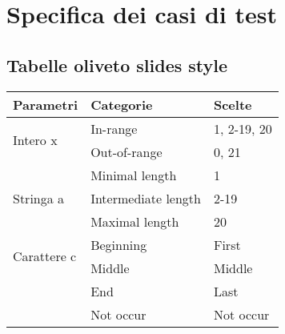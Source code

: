 \chapter{Specifica dei casi di test}

%		
%		
		
\section{Tabelle oliveto slides style}
		\begin{table}[ht]
		\centering
			\begin{tabular}{|p{4cm}|p{4cm}|p{4cm}|}
				\hline
				\textbf{Parametri} & \textbf{Categorie} & \textbf{Scelte} \tabularnewline
				\hline
				\multirow{2}{*}{Intero x}		& In-range 				& 1, 2-19, 20	\tabularnewline
				\cline{2-3}
												& Out-of-range			& 0, 21			\tabularnewline
				\hline
				\multirow{3}{*}{Stringa a}		& Minimal length 		& 1 			\tabularnewline
				\cline{2-3}
												& Intermediate length	& 2-19			\tabularnewline
				\cline{2-3}
												& Maximal length		& 20			\tabularnewline
				\hline
				\multirow{2}{*}{Carattere c}	& Beginning				& First			\tabularnewline
				\cline{2-3}
												& Middle				& Middle		\tabularnewline
				\cline{2-3}
												& End					& Last			\tabularnewline
				\cline{2-3}
												& Not occur 			& Not occur		\tabularnewline
				\hline
			\end{tabular}
		\end {table}

